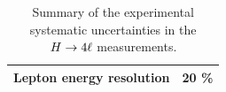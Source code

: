 \begin{table}[!htb]
\begin{center}
\begin{tabular}{|lc|}
Lepton energy resolution & 20 \% \\ 
\hline %
\hline %
\end{tabular}
\caption{
Summary of the experimental systematic uncertainties in the $H\to4\ell$ measurements. %
\label{tab:SystOverview}
}
\normalsize
\end{center}
\end{table}




